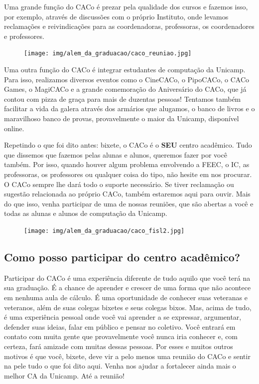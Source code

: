 Uma grande função do CACo é prezar pela qualidade dos cursos e fazemos isso,
por exemplo, através de discussões com o próprio Instituto, onde levamos
reclamações e reivindicações para as coordenadoras, professoras, os
coordenadores e professores.

\begin{figure}[H]
  \centering
  \texttt{[image: img/alem\_da\_graduacao/caco\_reuniao.jpg]}
\end{figure}

Uma outra função do CACo é integrar estudantes de computação da Unicamp. Para
isso, realizamos diversos eventos como o CineCACo, o PipoCACo, o CACo Games, 
o MagiCACo e a grande comemoração do Aniversário do CACo, que já contou com 
pizza de graça para mais de duzentas pessoas! Tentamos também facilitar a vida 
da galera através dos armários que alugamos, o banco de livros e o maravilhoso 
banco de provas, provavelmente o maior da Unicamp, disponível online.

Repetindo o que foi dito antes: bixete, o CACo é o \textbf{SEU} centro
acadêmico. Tudo que dissemos que fazemos pelas alunas e alunos, queremos fazer
por você também. Por isso, quando houver algum problema envolvendo a FEEC, o
IC, as professoras, os professores ou qualquer coisa do tipo, não hesite em nos
procurar. O CACo sempre lhe dará todo o suporte necessário. Se tiver reclamação
ou sugestão relacionada ao próprio CACo, também estaremos aqui para ouvir. Mais
do que isso, venha participar de uma de nossas reuniões, que são abertas a você
e todas as alunas e alunos de computação da Unicamp.

\begin{figure}[H]
  \centering
  \texttt{[image: img/alem\_da\_graduacao/caco\_fisl2.jpg]}
\end{figure}

\subsection{Como posso participar do centro acadêmico?}

Participar do CACo é uma experiência diferente de tudo aquilo que você terá na
sua graduação. É a chance de aprender e crescer de uma forma que não acontece
em nenhuma aula de cálculo. É uma oportunidade de conhecer suas veteranas e
veteranos, além de suas colegas bixetes e seus colegas bixos. Mas, acima de
tudo, é uma experiência pessoal onde você vai aprender a se expressar,
argumentar, defender suas ideias, falar em público e pensar no coletivo. Você
entrará em contato com muita gente que provavelmente você nunca iria conhecer
e, com certeza, fará amizade com muitas dessas pessoas. Por esses e muitos
outros motivos é que você, bixete, deve vir a pelo menos uma reunião do CACo e
sentir na pele tudo o que foi dito aqui. Venha nos ajudar a fortalecer ainda
mais o melhor CA da Unicamp. Até a reunião!

